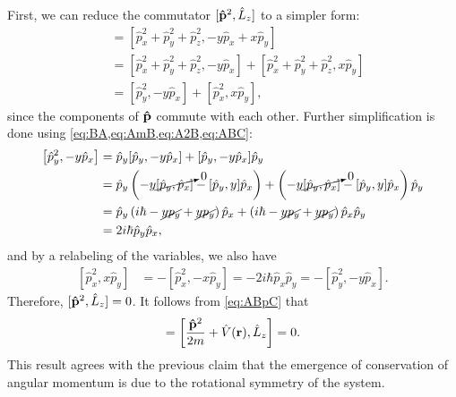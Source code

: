     First, we can reduce the commutator $[\mathbf{\hat{p}}^2,\hat{L}_z]$ to a simpler form:
    \begin{align*}
        [\vh{p}^2,\hat{L}_z]
            &= \left[ \hat{p}_x^2 + \hat{p}_y^2 + \hat{p}_z^2, -y \hat{p}_x + x \hat{p}_y \right] \\
            &= \left[ \hat{p}_x^2 + \hat{p}_y^2 + \hat{p}_z^2, -y \hat{p}_x \right] + \left[ \hat{p}_x^2 + \hat{p}_y^2 + \hat{p}_z^2, x \hat{p}_y \right] \\
            &= \left[ \hat{p}_y^2, -y \hat{p}_x \right] + \left[ \hat{p}_x^2, x \hat{p}_y \right],
    \end{align*}
    since the components of $\mathbf{\hat{p}}$ commute with each other. Further simplification is done using \cref{eq:BA,eq:AmB,eq:A2B,eq:ABC}:
    \begin{align*}
        \left[ \hat{p}_y^2, -y \hat{p}_x \right]
            &= \hat{p}_y [\hat{p}_y, -y \hat{p}_x ] + [\hat{p}_y, -y \hat{p}_x ]\hat{p}_y \\
            &= \hat{p}_y \left( -y \cancelto{0}{[\hat{p}_y, \hat{p}_x ]} - [\hat{p}_y, y] \hat{p}_x \right) + \left( -y \cancelto{0}{[\hat{p}_y, \hat{p}_x ]} - [\hat{p}_y, y] \hat{p}_x \right)\hat{p}_y \\
            &= \hat{p}_y \left( i\hbar - \cancel{yp_y} + \cancel{yp_y} \right) \hat{p}_x + \left( i\hbar - \cancel{yp_y} + \cancel{yp_y} \right) \hat{p}_x\hat{p}_y \\
            &= 2i\hbar \hat{p}_y \hat{p}_x,
    \end{align*}
    and by a relabeling of the variables, we also have
    \begin{align*}
        \left[ \hat{p}_x^2, x \hat{p}_y \right] &= -\left[ \hat{p}_x^2, -x \hat{p}_y \right] = -2i\hbar \hat{p}_x \hat{p}_y = -\left[ \hat{p}_y^2, -y \hat{p}_x \right].
    \end{align*}
    Therefore, $[\mathbf{\hat{p}}^2,\hat{L}_z] = 0$. It follows from \cref{eq:ABpC} that
    \begin{align*}
        [\hat{H},\hat{L}_z] = \left[ \frac{\vh{p}^2}{2m}  + \hat{V}(\vec{r}), \hat{L}_z \right] = 0.
    \end{align*}
    This result agrees with the previous claim that the emergence of conservation of angular momentum is due to the rotational symmetry of the system.
    
